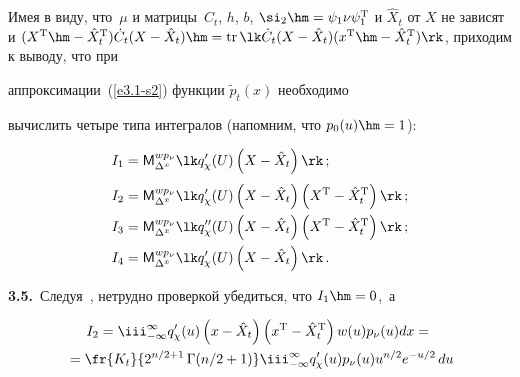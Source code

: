  Имея в виду, что~$\mu$ и матрицы~$C_t$, $h$, $b$, $\si_2 \hm=\psi_1 \nu

\psi_1^{\mathrm{T}}$ и $ \hat X_t$ от $X$ не зависят и $(X^{\mathrm{T}} \hm-\hat

X_t^{\mathrm{T}}) \dot C_t(X-\hat X_t) \hm= \mathrm{tr}\, \lk \dot C_t (X-\hat

X_t) (x^{\mathrm{T}}\hm-\hat X_t^{\mathrm{T}})\rk$, приходим к выводу, что при

аппроксимации~(\ref{e3.1-s2}) функции $\tilde p_t (x)$ необходимо

вычислить четыре типа интегралов (напомним, что $p_0 (u) \hm=1$):

\begin{align*}

    I_1 &= {\sf M}_{\Delta^x}^{w p_\nu} \lk q_\chi '(U) \left(X-\hat X_t\right)\rk\,;\\[3pt]

    I_2 &= {\sf M}_{\Delta^x}^{w p_\nu}\lk q_\chi'(U) \left(X-\hat X_t\right)

    \left(X^{\mathrm{T}}-\hat X_t^{\mathrm{T}}\right) \rk\,;\\

    I_3 &= {\sf M}_{\Delta^x}^{w p_\nu}\lk q_\chi''(U) \left(X-\hat X_t\right)

    \left(X^{\mathrm{T}}-\hat X_t^{\mathrm{T}}\right)\rk\,;\\

    I_4 &= {\sf M}_{\Delta^x}^{w p_\nu}\lk q_\chi'(U) \left(X-\hat X_t\right)\rk\,.


    \end{align*}



\textbf{3.5.}\ Следуя~\cite{6-s2}, нетрудно проверкой убедиться, что $I_1 \hm=0$,~а



\noindent

\begin{multline}

    I_2 = \iii_{-\infty}^\infty q_\chi '(u) \left(x-\hat X_t\right)

    \left(x^{\mathrm{T}}-\hat X_t^{\mathrm{T}}\right) w(u)

    p_\nu (u) dx={}\\

    {}= \fr{K_t}{2^{n/2+1} \,\Gamma (n/2+1)}

    \iii_{-\infty}^\infty q_\chi '(u) p_\nu (u) u^{n/2} e^{-u/2}  \,du

    \label{e3.24-s2}

    \end{multline}

